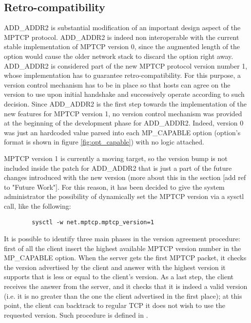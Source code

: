 \subsection{Retro-compatibility}
\label{retrocomp}
ADD\_ADDR2 is substantial modification of an important design aspect of the MPTCP protocol. ADD\_ADDR2 is indeed non interoperable with the current stable implementation of MPTCP version 0, since the augmented length of the option would cause the older network stack to discard the option right away.
ADD\_ADDR2 is considered part of the new MPTCP protocol version number 1, whose implementation has to guarantee retro-compatibility. For this purpose, a version control mechanism has to be in place so that hosts can agree on the version to use upon initial handshake and successively operate according to such decision. Since ADD\_ADDR2 is the first step towards the implementation of the new features for MPTCP version 1, no version control mechanism was provided at the beginning of the development phase for ADD\_ADDR2. Indeed, version 0 was just an hardcoded value parsed into each MP\_CAPABLE option (option's format is shown in figure \ref{fig:opt_capable}) with no logic attached.


MPTCP version 1 is currently a moving target, so the version bump is not included inside the patch for ADD\_ADDR2 that is just a part of the future changes introduced with the new version (more about this in the section [add ref to "Future Work"]. For this reason, it has been decided to give the system administrator the possibility of dynamically set the MPTCP version via a sysctl call, like the following:

\begin{verbatim}
        sysctl -w net.mptcp.mptcp_version=1
\end{verbatim}

It is possible to identify three main phases in the version agreement procedure: first of all the client insert the highest available MPTCP version number in the MP\_CAPABLE option. When the server gets the first MPTCP packet, it checks the version advertised by the client and answer with the highest version it supports that is less or equal to the client's version. As a last step, the client receives the answer from the server, and it checks that it is indeed a valid version (i.e. it is no greater than the one the client advertised in the first place); at this point, the client can backtrack to regular TCP it does not wish to use the requested version. Such procedure is defined in .

